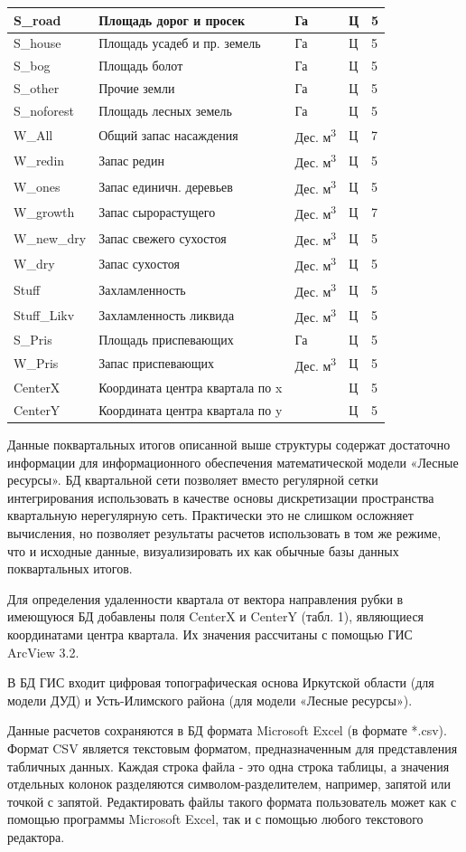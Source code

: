 \documentclass{article}
\begin{document}
\begin{flushright}
\begin{tabular}{|>{\raggedright}p{71pt}|>{\raggedright}p{200pt}|>{\raggedright}p{58pt}|>{\raggedright}p{22pt}|>{\raggedright}p{51pt}|}
\hline
S\_road & Площадь дорог и просек & Га & Ц & 5\tabularnewline
\hline
S\_house & Площадь усадеб и пр. земель & Га & Ц & 5\tabularnewline
\hline
S\_bog & Площадь болот & Га & Ц & 5\tabularnewline
\hline
S\_other & Прочие земли & Га & Ц & 5\tabularnewline
\hline
S\_noforest & Площадь лесных земель & Га & Ц & 5\tabularnewline
\hline
W\_All & Общий запас насаждения & Дес. м\textsuperscript{3} & Ц & 7\tabularnewline
\hline
W\_redin & Запас редин & Дес. м\textsuperscript{3} & Ц & 5\tabularnewline
\hline
W\_ones & Запас единичн. деревьев & Дес. м\textsuperscript{3} & Ц & 5\tabularnewline
\hline
W\_growth & Запас сырорастущего & Дес. м\textsuperscript{3} & Ц & 7\tabularnewline
\hline
W\_new\_dry & Запас свежего сухостоя & Дес. м\textsuperscript{3} & Ц & 5\tabularnewline
\hline
W\_dry & Запас сухостоя & Дес. м\textsuperscript{3} & Ц & 5\tabularnewline
\hline
Stuff & Захламленность & Дес. м\textsuperscript{3} & Ц & 5\tabularnewline
\hline
Stuff\_Likv & Захламленность ликвида & Дес. м\textsuperscript{3} & Ц & 5\tabularnewline
\hline
S\_Pris & Площадь приспевающих & Га & Ц & 5\tabularnewline
\hline
W\_Pris & Запас приспевающих & Дес. м\textsuperscript{3} & Ц & 5\tabularnewline
\hline
CenterX & Координата центра квартала по x &  & Ц & 5\tabularnewline
\hline
CenterY & Координата центра квартала по y &  & Ц & 5\tabularnewline
\hline
\end{tabular}
\end{flushright}

Данные поквартальных итогов описанной выше 
структуры содержат достаточно информации для 
информационного обеспечения математической 
модели «Лесные ресурсы». БД квартальной сети 
позволяет вместо регулярной сетки интегрирования 
использовать в качестве основы дискретизации 
пространства квартальную нерегулярную сеть. 
Практически это не слишком осложняет вычисления, 
но позволяет результаты расчетов использовать 
в том же режиме, что и исходные данные, визуализировать 
их как обычные базы данных поквартальных итогов. 

Для определения удаленности квартала от вектора 
направления рубки в имеющуюся БД добавлены 
поля CenterX и CenterY (табл. 1), являющиеся координатами 
центра квартала. Их значения рассчитаны с помощью 
ГИС ArcView 3.2.

В БД ГИС входит цифровая топографическая основа 
Иркутской области (для модели ДУД) и Усть-Илимского 
района (для модели «Лесные ресурсы»).

Данные расчетов сохраняются в БД формата Microsoft 
Excel (в формате *.csv). Формат CSV является текстовым 
форматом, предназначенным для представления 
табличных данных. Каждая строка файла - это 
одна строка таблицы, а значения отдельных колонок 
разделяются символом-разделителем, например, 
запятой или точкой с запятой. Редактировать 
файлы такого формата пользователь может как 
с помощью программы Microsoft Excel, так и с помощью 
любого текстового редактора.
\end{document}
